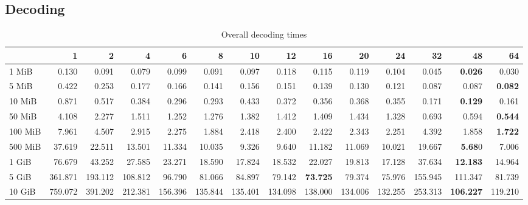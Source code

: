 \subsection{Decoding}
\begin{centering}
\begin{table}[!h]
	\caption{Overall decoding times}
	\begin{tabular}{lrrrrrrrrrrrrr}
		\toprule
		\diagbox[width=7em]{Size}{Threads} &      1  &      2  &      4  &      6  &      8  &      10 &      12 &      16 &      20 &      24 &      32 &      48 &      64 \\
		\midrule
		1 MiB   &   0.130 &   0.091 &   0.079 &   0.099 &   0.091 &   0.097 &   0.118 &   0.115 &   0.119 &   0.104 &   0.045 &   \textbf{0.026} &   0.030 \\
		5 MiB   &   0.422 &   0.253 &   0.177 &   0.166 &   0.141 &   0.156 &   0.151 &   0.139 &   0.130 &   0.121 &   0.087 &   0.087 &   \textbf{0.082} \\
		10 MiB  &   0.871 &   0.517 &   0.384 &   0.296 &   0.293 &   0.433 &   0.372 &   0.356 &   0.368 &   0.355 &   0.171 &   \textbf{0.129} &   0.161 \\
		50 MiB  &   4.108 &   2.277 &   1.511 &   1.252 &   1.276 &   1.382 &   1.412 &   1.409 &   1.434 &   1.328 &   0.693 &   0.594 &   \textbf{0.544} \\
		100 MiB &   7.961 &   4.507 &   2.915 &   2.275 &   1.884 &   2.418 &   2.400 &   2.422 &   2.343 &   2.251 &   4.392 &   1.858 &   \textbf{1.722} \\
		500 MiB &  37.619 &  22.511 &  13.501 &  11.334 &  10.035 &   9.326 &   9.640 &  11.182 &  11.069 &  10.021 &  19.667 &   \textbf{5.68}0 &   7.006 \\
		1 GiB   &  76.679 &  43.252 &  27.585 &  23.271 &  18.590 &  17.824 &  18.532 &  22.027 &  19.813 &  17.128 &  37.634 &  \textbf{12.183} &  14.964 \\
		5 GiB   & 361.871 & 193.112 & 108.812 &  96.790 &  81.066 &  84.897 &  79.142 &  \textbf{73.725} &  79.374 &  75.976 & 155.945 & 111.347 &  81.739 \\
		10 GiB  & 759.072 & 391.202 & 212.381 & 156.396 & 135.844 & 135.401 & 134.098 & 138.000 & 134.006 & 132.255 & 253.313 & \textbf{106.227} & 119.210 \\
		\bottomrule
	\end{tabular}
\end{table}


\end{centering}
